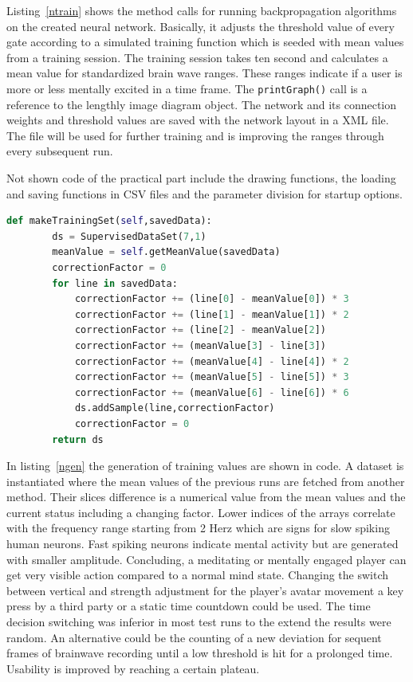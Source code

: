 \documentclass[bibtotocnumbered, headsepline,normalheadings,12pt]{report}
\begin{document}
Listing~\ref{ntrain} shows the method calls for running backpropagation algorithms on the created neural network. Basically, it adjusts the threshold
value of every gate according to a simulated training function which is seeded with mean values from a training session. The training session takes
ten second and calculates a mean value for standardized brain wave ranges. These ranges indicate if a user is more or less mentally excited in a
time frame. The \texttt{printGraph()} call is a reference to the lengthly image diagram object. The network and its connection weights and threshold values
are saved with the network layout in a XML file. The file will be used for further training and is improving the ranges through every subsequent run.

Not shown code of the practical part include the drawing functions, the loading and saving functions in CSV files and the parameter division for startup
options. 


\begin{lstlisting}[float,language=Python,caption=Generating Training Values, label=ngen]
    def makeTrainingSet(self,savedData):
        ds = SupervisedDataSet(7,1)
        meanValue = self.getMeanValue(savedData)
        correctionFactor = 0
        for line in savedData:
            correctionFactor += (line[0] - meanValue[0]) * 3
            correctionFactor += (line[1] - meanValue[1]) * 2
            correctionFactor += (line[2] - meanValue[2])
            correctionFactor += (meanValue[3] - line[3])
            correctionFactor += (meanValue[4] - line[4]) * 2
            correctionFactor += (meanValue[5] - line[5]) * 3
            correctionFactor += (meanValue[6] - line[6]) * 6
            ds.addSample(line,correctionFactor)
            correctionFactor = 0
        return ds
\end{lstlisting}

In listing~\ref{ngen} the generation of training values are shown in code. A dataset is instantiated where the mean values of the previous runs 
are fetched from another method. Their slices difference is a numerical value from the mean values and the current status including a changing factor.
Lower indices of the arrays correlate with the frequency range starting from 2 Herz which are signs for slow spiking human neurons. Fast spiking neurons
indicate mental activity but are generated with smaller amplitude. Concluding, a meditating or mentally engaged 
player can get very visible action compared to a normal mind state. Changing the switch between vertical and strength adjustment for the player's 
avatar movement a key press by a third party or a static time countdown could be used. The time decision switching was inferior in most test runs 
to the extend the results were random. An alternative could be the counting of a new deviation for sequent frames of brainwave recording until a low
threshold is hit for a prolonged time. Usability is improved by reaching a certain plateau. 
\end{document}
